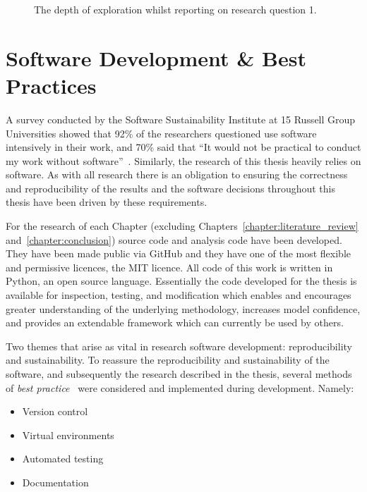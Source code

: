\begin{figure}[!hbtp]
    \centering
    
    \caption{The depth of exploration whilst reporting on research question 1.}\label{fig:depth_structure}
\end{figure}

\section{Software Development \& Best Practices}\label{section:introduction_software_development}

A survey conducted by the Software Sustainability Institute at 15 Russell Group
Universities showed that 92\% of the researchers questioned use software
intensively in their work, and 70\% said that ``It would not be practical to
conduct my work without software''~\cite{ssi_blog}. Similarly, the research of
this thesis heavily relies on software. As with all research there is an
obligation to ensuring the correctness and reproducibility of the results and the
software decisions throughout this thesis have been driven by these
requirements.

For the research of each Chapter (excluding Chapters~\ref{chapter:literature_review}
and~\ref{chapter:conclusion}) source code and analysis code have been developed.
They have been made public via GitHub and they have one of the most flexible and
permissive licences, the MIT licence. All code of this work is written in Python, an open source
language. Essentially the code developed for the thesis is available for inspection,
testing, and modification which enables and encourages
greater understanding of the underlying methodology, increases model confidence,
and provides an extendable framework which can currently be used by others.

Two themes that arise as vital in research software development:
reproducibility and sustainability. To reassure the reproducibility and
sustainability of the software, and subsequently the research described in the
thesis, several methods of
\textit{best practice}~\cite{Aberdour2007, Benureau2018, Crick2014, Hong2015}
were considered and implemented during development. Namely:

\begin{itemize}
    \item Version control
    \item Virtual environments
    \item Automated testing
    \item Documentation
\end{itemize}

